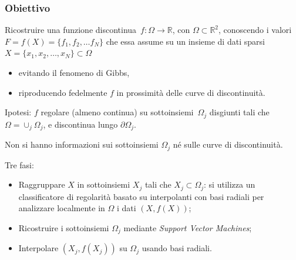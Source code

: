 \documentclass[10pt]{beamer}
\theoremstyle{definition}
\theoremstyle{plain}
\def\R{\mathbb R}
\begin{document}
\begin{frame}
\frametitle{Obiettivo}
Ricostruire  una \alert{funzione discontinua}~$f:\Omega\to\R$, con $\Omega\subset\R^2$, conoscendo i valori $F = f(X) = \{f_1,f_2,\dots f_N\}$ che essa assume su un insieme di \alert{dati sparsi} $X=\{x_1,x_2,\dots,x_N\}\subset\Omega$

\begin{itemize}
\item evitando il fenomeno di Gibbs,
\item riproducendo fedelmente $f$ in prossimità delle curve di discontinuità.
\end{itemize}

\bigskip\medskip

\alert{Ipotesi}: $f$ regolare (almeno continua) su sottoinsiemi~$\Omega_j$ disgiunti tali che $\Omega = \cup_j \Omega_j$, e discontinua lungo $\partial \Omega_j$.

\medskip
Non si hanno informazioni sui sottoinsiemi $\Omega_j$ né sulle curve di discontinuità.



\end{frame}

\begin{frame}

Tre fasi:

\bigskip\smallskip

\begin{itemize}
\item Raggruppare  $X$ in sottoinsiemi $X_j$ tali che $X_j\subset \Omega_j$:
	 si utilizza un \alert{classificatore} di regolarità basato su interpolanti con basi radiali per analizzare localmente in $\Omega$ i dati $(X,f(X))$;

\bigskip\smallskip

\item Ricostruire i sottoinsiemi $\Omega_j$  mediante {\em Support Vector Machines};

\bigskip\smallskip

\item Interpolare $(X_j, f(X_j))$ su $\Omega_j$ usando basi radiali.
\end{itemize}
\end{frame}
\end{document}
